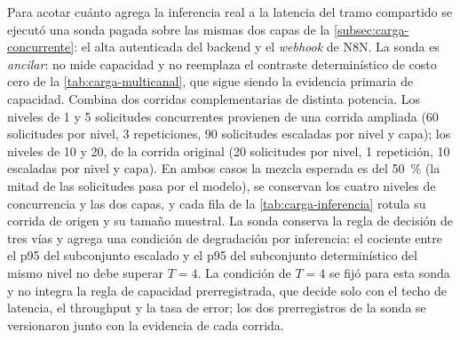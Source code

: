 Para acotar cuánto agrega la inferencia real a la latencia del tramo compartido se ejecutó una sonda pagada sobre las mismas dos capas de la \autoref{subsec:carga-concurrente}: el alta autenticada del backend y el \emph{webhook} de N8N. La sonda es \emph{ancilar}: no mide capacidad y no reemplaza el contraste determinístico de costo cero de la \autoref{tab:carga-multicanal}, que sigue siendo la evidencia primaria de capacidad. Combina dos corridas complementarias de distinta potencia. Los niveles de 1 y 5 solicitudes concurrentes provienen de una corrida ampliada (60 solicitudes por nivel, 3 repeticiones, 90 solicitudes escaladas por nivel y capa); los niveles de 10 y 20, de la corrida original (20 solicitudes por nivel, 1 repetición, 10 escaladas por nivel y capa). En ambos casos la mezcla esperada es del 50~\% (la mitad de las solicitudes pasa por el modelo), se conservan los cuatro niveles de concurrencia y las dos capas, y cada fila de la \autoref{tab:carga-inferencia} rotula su corrida de origen y su tamaño muestral. La sonda conserva la regla de decisión de tres vías y agrega una condición de degradación por inferencia: el cociente entre el p95 del subconjunto escalado y el p95 del subconjunto determinístico del mismo nivel no debe superar $T = 4$. La condición de $T = 4$ se fijó para esta sonda y no integra la regla de capacidad prerregistrada, que decide solo con el techo de latencia, el throughput y la tasa de error; los dos prerregistros de la sonda se versionaron junto con la evidencia de cada corrida.

